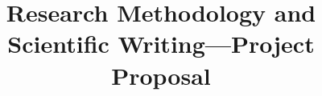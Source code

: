 \usepackage[
backend=biber,
style=numeric,
firstinits=true,
url=false,
isbn=false,
safeinputenc,%
]{biblatex}


\title{Research Methodology and Scientific Writing---Project Proposal}
